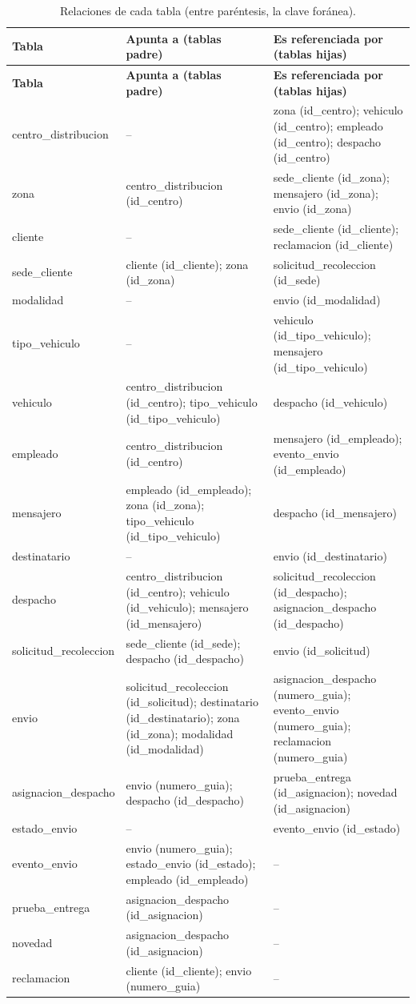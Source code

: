 {\singlespacing\footnotesize
\begin{longtable}{L{3.5cm} L{5.4cm} L{5.5cm}}
\caption{Relaciones de cada tabla (entre paréntesis, la clave foránea).}
\label{tab:relaciones6}\\
\toprule
\textbf{Tabla} & \textbf{Apunta a (tablas padre)} & \textbf{Es referenciada por (tablas hijas)} \\
\midrule
\endfirsthead
\toprule
\textbf{Tabla} & \textbf{Apunta a (tablas padre)} & \textbf{Es referenciada por (tablas hijas)} \\
\midrule
\endhead
\bottomrule
\endfoot
centro\_distribucion & -- & zona (id\_centro); vehiculo (id\_centro); empleado (id\_centro); despacho (id\_centro) \\
zona & centro\_distribucion (id\_centro) & sede\_cliente (id\_zona); mensajero (id\_zona); envio (id\_zona) \\
cliente & -- & sede\_cliente (id\_cliente); reclamacion (id\_cliente) \\
sede\_cliente & cliente (id\_cliente); zona (id\_zona) & solicitud\_recoleccion (id\_sede) \\
modalidad & -- & envio (id\_modalidad) \\
tipo\_vehiculo & -- & vehiculo (id\_tipo\_vehiculo); mensajero (id\_tipo\_vehiculo) \\
vehiculo & centro\_distribucion (id\_centro); tipo\_vehiculo (id\_tipo\_vehiculo) & despacho (id\_vehiculo) \\
empleado & centro\_distribucion (id\_centro) & mensajero (id\_empleado); evento\_envio (id\_empleado) \\
mensajero & empleado (id\_empleado); zona (id\_zona); tipo\_vehiculo (id\_tipo\_vehiculo) & despacho (id\_mensajero) \\
destinatario & -- & envio (id\_destinatario) \\
despacho & centro\_distribucion (id\_centro); vehiculo (id\_vehiculo); mensajero (id\_mensajero) & solicitud\_recoleccion (id\_despacho); asignacion\_despacho (id\_despacho) \\
solicitud\_recoleccion & sede\_cliente (id\_sede); despacho (id\_despacho) & envio (id\_solicitud) \\
envio & solicitud\_recoleccion (id\_solicitud); destinatario (id\_destinatario); zona (id\_zona); modalidad (id\_modalidad) & asignacion\_despacho (numero\_guia); evento\_envio (numero\_guia); reclamacion (numero\_guia) \\
asignacion\_despacho & envio (numero\_guia); despacho (id\_despacho) & prueba\_entrega (id\_asignacion); novedad (id\_asignacion) \\
estado\_envio & -- & evento\_envio (id\_estado) \\
evento\_envio & envio (numero\_guia); estado\_envio (id\_estado); empleado (id\_empleado) & -- \\
prueba\_entrega & asignacion\_despacho (id\_asignacion) & -- \\
novedad & asignacion\_despacho (id\_asignacion) & -- \\
reclamacion & cliente (id\_cliente); envio (numero\_guia) & -- \\
\end{longtable}
\par}

